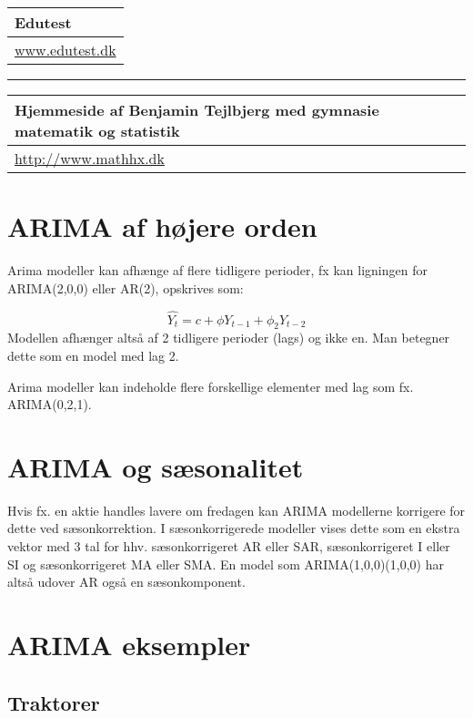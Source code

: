 \documentclass[]{book}
\begin{document}
\begin{longtable}[]{@{}l@{}}
\toprule
Edutest\tabularnewline
\midrule
\endhead
\href{http://www.edutest.dk}{www.edutest.dk}\tabularnewline
\bottomrule
\end{longtable}

\begin{center}\rule{0.5\linewidth}{\linethickness}\end{center}

\begin{longtable}[]{@{}l@{}}
\toprule
Hjemmeside af Benjamin Tejlbjerg med gymnasie matematik og statistik\tabularnewline
\midrule
\endhead
\href{http://www.mathhx.dk/?q=node/117}{http://www.mathhx.dk}\tabularnewline
\bottomrule
\end{longtable}

\hypertarget{arima-af-hjere-orden}{%
\section{ARIMA af højere orden}\label{arima-af-hjere-orden}}

Arima modeller kan afhænge af flere tidligere perioder, fx kan ligningen for ARIMA(2,0,0) eller AR(2), opskrives som:

\[\hat{Y_t}=c + \phi Y_{t-1}+ \phi_2 Y_{t-2}\]
Modellen afhænger altså af 2 tidligere perioder (lags) og ikke en. Man betegner dette som en model med lag 2.

Arima modeller kan indeholde flere forskellige elementer med lag som fx. ARIMA(0,2,1).

\hypertarget{arima-og-ssonalitet}{%
\section{ARIMA og sæsonalitet}\label{arima-og-ssonalitet}}

Hvis fx. en aktie handles lavere om fredagen kan ARIMA modellerne korrigere for dette ved sæsonkorrektion. I sæsonkorrigerede modeller vises dette som en ekstra vektor med 3 tal for hhv. sæsonkorrigeret AR eller SAR, sæsonkorrigeret I eller SI og sæsonkorrigeret MA eller SMA. En model som ARIMA(1,0,0)(1,0,0) har altså udover AR også en sæsonkomponent.

\hypertarget{arima-eksempler}{%
\section{ARIMA eksempler}\label{arima-eksempler}}

\hypertarget{traktorer}{%
\subsection{Traktorer}\label{traktorer}}
\end{document}
